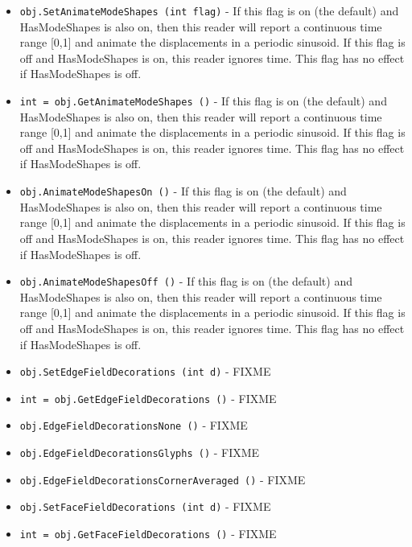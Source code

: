\begin{itemize}
\item  \verb|obj.SetAnimateModeShapes (int flag)| -  If this flag is on (the default) and HasModeShapes is also on, then this
 reader will report a continuous time range [0,1] and animate the
 displacements in a periodic sinusoid.  If this flag is off and
 HasModeShapes is on, this reader ignores time.  This flag has no effect if
 HasModeShapes is off.

\item  \verb|int = obj.GetAnimateModeShapes ()| -  If this flag is on (the default) and HasModeShapes is also on, then this
 reader will report a continuous time range [0,1] and animate the
 displacements in a periodic sinusoid.  If this flag is off and
 HasModeShapes is on, this reader ignores time.  This flag has no effect if
 HasModeShapes is off.

\item  \verb|obj.AnimateModeShapesOn ()| -  If this flag is on (the default) and HasModeShapes is also on, then this
 reader will report a continuous time range [0,1] and animate the
 displacements in a periodic sinusoid.  If this flag is off and
 HasModeShapes is on, this reader ignores time.  This flag has no effect if
 HasModeShapes is off.

\item  \verb|obj.AnimateModeShapesOff ()| -  If this flag is on (the default) and HasModeShapes is also on, then this
 reader will report a continuous time range [0,1] and animate the
 displacements in a periodic sinusoid.  If this flag is off and
 HasModeShapes is on, this reader ignores time.  This flag has no effect if
 HasModeShapes is off.

\item  \verb|obj.SetEdgeFieldDecorations (int d)| -  FIXME

\item  \verb|int = obj.GetEdgeFieldDecorations ()| -  FIXME

\item  \verb|obj.EdgeFieldDecorationsNone ()| -  FIXME

\item  \verb|obj.EdgeFieldDecorationsGlyphs ()| -  FIXME

\item  \verb|obj.EdgeFieldDecorationsCornerAveraged ()| -  FIXME

\item  \verb|obj.SetFaceFieldDecorations (int d)| -  FIXME

\item  \verb|int = obj.GetFaceFieldDecorations ()| -  FIXME


\end{itemize}
